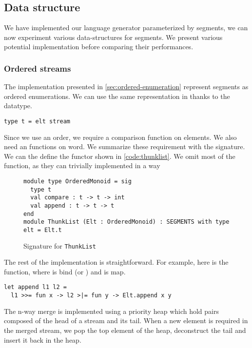 \subsection{Data structure}

We have implemented our language generator parameterized by segments, we can now
experiment various data-structures for segments. We present various
potential implementation before comparing their performances.

\subsubsection{Ordered streams}

The \haskell implementation presented in \autoref{sec:ordered-enumeration}
represent segments as ordered enumerations. We can use
the same representation in \ocaml thanks to the  datatype.
\begin{lstlisting}[numbers=none]
type t = elt stream
\end{lstlisting}

Since we use an order, we require a comparison function on elements.
We also need an  functions on word. We summarize these requirement
with the  signature.
We can the define the  functor shown in \autoref{code:thunklist}.
We omit most of the function, as they can trivially implemented in a way

\begin{figure}
  \centering
\begin{lstlisting}
module type OrderedMonoid = sig
  type t
  val compare : t -> t -> int
  val append : t -> t -> t
end
module ThunkList (Elt : OrderedMonoid) : SEGMENTS with type elt = Elt.t
\end{lstlisting}
  \caption{Signature for \texttt{ThunkList}}
  \label{code:thunklist}
\end{figure}

The rest of the implementation is straightforward. For example, here is the
 function, where \code{>>=} is bind (or )
and \code{>|=} is map.

\begin{lstlisting}
let append l1 l2 =
  l1 >>= fun x -> l2 >|= fun y -> Elt.append x y
\end{lstlisting}

The n-way merge is implemented using a priority heap which hold pairs composed
of the head of a stream and its tail. When a new element is required in the
merged stream, we pop the top element of the heap, deconstruct
the tail and insert it back in the heap.

